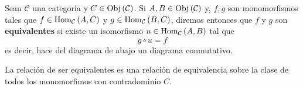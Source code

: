\documentclass[12pt]{report}
\theoremstyle{largebreak}
\newcommand{\Obj}[1]{\ensuremath{\textup{Obj}\left(#1\right)}}
\newcommand{\Hom}[3]{\ensuremath{\textup{Hom}_{#1}\left(#2,#3\right)}}
\begin{document}
    \begin{mydef}
        Sean $\mathcal{C}$ una categoría y $C\in\Obj{\mathcal{C}}$. Si $A,B\in\Obj{\mathcal{C}}$ y, $f,g$ son monomorfismos tales que $f\in\Hom{\mathcal{C}}{A}{C}$ y $g\in\Hom{\mathcal{C}}{B}{C}$, diremos entonces que $f$ y $g$ son \textbf{equivalentes} si existe un isomorfismo $u\in\Hom{\mathcal{C}}{A}{B}$ tal que
        \begin{equation*}
            g\circ u=f
        \end{equation*}
        es decir, hace del diagrama de abajo un diagrama conmutativo.

        La relación de ser equivalentes es una relación de equivalencia sobre la clase de todos los monomorfimos con contradominio $C$.
    \end{mydef}
\end{document}
